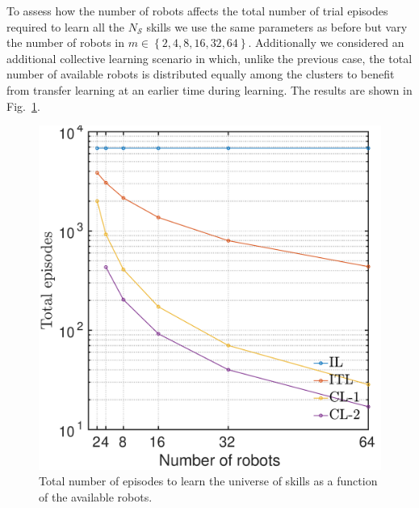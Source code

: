 To assess how the number of robots affects the total number of trial episodes required to learn all the $N_\mathcal{S}$ skills we use the same parameters as before but vary the number of robots in $m \in \left \lbrace 2,4,8,16,32,64\right \rbrace$. Additionally we considered an additional collective learning scenario in which, unlike the previous case, the total number of available robots is distributed equally among the clusters to benefit from transfer learning at an earlier time during learning. The results are shown in Fig.~\ref{fig:total_episodes_per_n_robots}. 
\begin{figure}[!th]
	\centering
	\includegraphics[width=0.9\columnwidth]{fig/total_episodes_per_n_robots.pdf}
	\caption{Total number of episodes to learn the universe of skills as a function of the available robots.}
	\label{fig:total_episodes_per_n_robots}
\end{figure}




